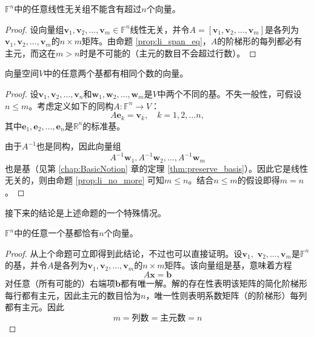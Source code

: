 \begin{proposition}\label{prop:li_no_more}
  $\mathbb{F}^{n}$中的任意线性无关组不能含有超过$n$个向量。
\end{proposition}

\begin{proof}
  设向量组$\mathbf{v}_{1},\mathbf{v}_{2},\ldots,\mathbf{v}_{m}\in\mathbb{F}^{n}$线性无关，并令$A=[\mathbf{v}_{1},\mathbf{v}_{2},\ldots,\mathbf{v}_{m}]$是各列为$\mathbf{v}_{1},\mathbf{v}_{2},\ldots,\mathbf{v}_{m}$的$n\times m$矩阵。由命题 \ref{prop:li_span_eq}，$A$的阶梯形的每列都必有主元，而这在$m>n$时是不可能的（主元的数目不会超过行数）。
\end{proof}

\begin{proposition}\label{prop:basis_same_size}
  向量空间$V$中的任意两个基都有相同个数的向量。
\end{proposition}

\begin{proof}
  设$\mathbf{v}_{1},\mathbf{v}_{2},\ldots,\mathbf{v}_{n}$和$\mathbf{w}_{1},\mathbf{w}_{2},\ldots,\mathbf{w}_{m}$是$V$中两个不同的基。不失一般性，可假设$n\le m$。考虑定义如下的同构$A:\mathbb{F}^{n}\to V$：\[A\mathbf{e}_k=\mathbf{v}_k,\quad k=1,2,\ldots n,\]其中$\mathbf{e}_1,\mathbf{e}_2,\ldots,\mathbf{e}_n$是$\mathbb{R}^n$的标准基。

  由于$A^{-1}$也是同构，因此向量组\[A^{-1}\mathbf{w}_1,A^{-1}\mathbf{w}_2,\ldots,A^{-1}\mathbf{w}_m\]也是基（见第 \ref{chap:BasicNotion} 章的定理 \ref{thm:preserve_basis}）。因此它是线性无关的，则由命题 \ref{prop:li_no_more} 可知$m\le n$。结合$n\le m$的假设即得$m=n$。
\end{proof}

接下来的结论是上述命题的一个特殊情况。
\begin{proposition}\label{prop:basis_size_n}
    $\mathbb{F}^{n}$中的任意一个基都恰有$n$个向量。
\end{proposition}
\begin{proof}
  从上个命题可立即得到此结论，不过也可以直接证明。设$\mathbf{v}_{1},$ $\mathbf{v}_{2},\ldots,\mathbf{v}_{m}$是$\mathbb{F}^{n}$的基，并令$A$是各列为$\mathbf{v}_{1},\mathbf{v}_{2},\ldots,\mathbf{v}_{m}$的$n\times m$矩阵。该向量组是基，意味着方程\[A\mathbf{x}=\mathbf{b}\]对任意（所有可能的）右端项$\mathbf{b}$都有唯一解。解的存在性表明该矩阵的简化阶梯形每行都有主元，因此主元的数目恰为$n$，唯一性则表明系数矩阵（的阶梯形）每列都有主元。因此\[m = \text{列数} = \text{主元数} = n\]
\end{proof}

